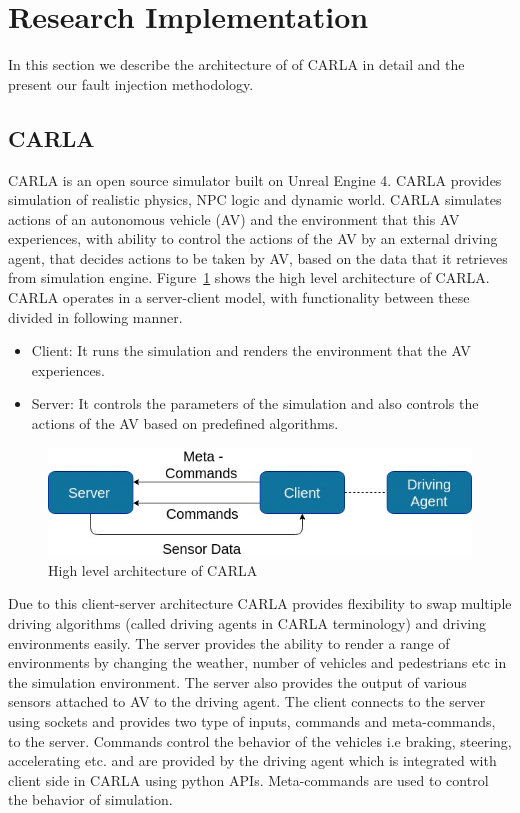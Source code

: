 \section{Research Implementation}
In this section we describe the architecture of of CARLA in detail and the present our fault injection methodology. 

\subsection{CARLA}
CARLA is an open source simulator built on Unreal Engine 4. CARLA provides simulation of realistic physics, NPC logic and dynamic world. CARLA simulates actions of an autonomous vehicle (AV) and the environment that this AV experiences, with ability to control the actions of the AV by an external driving agent,  that decides actions to be taken by AV, based on the data that it retrieves from simulation engine. Figure~\ref{fig:carla_arch} shows the high level architecture of CARLA. CARLA operates in a server-client model, with functionality between these divided in following manner.

\begin{itemize}
	\item Client: It runs the simulation and renders the environment that the AV experiences.
	\item Server: It controls the parameters of the simulation and also controls the actions of the AV based on predefined algorithms. 
	
\end{itemize}

\begin{figure}  [h]
	\vspace{-0.5em}
	\centering
	\includegraphics[scale=0.33]{CARLA_block}
	\vspace{-0.5em}
	\caption{High level architecture of CARLA}
	\label{fig:carla_arch}
	\vspace{-1.5em}
\end{figure}

Due to this client-server architecture CARLA provides flexibility to swap multiple driving algorithms (called driving agents in CARLA terminology) and driving environments easily. The server provides the ability to render a range of environments by changing the weather, number of vehicles and pedestrians etc in the simulation environment. The server also provides the output of various sensors attached to AV to the driving agent. The client connects to the server using sockets and provides two type of inputs, commands and meta-commands, to the server. Commands control the behavior of the vehicles i.e braking, steering, accelerating etc. and are provided by the driving agent which is integrated with client side in CARLA using python APIs. Meta-commands are used to control the behavior of simulation.

